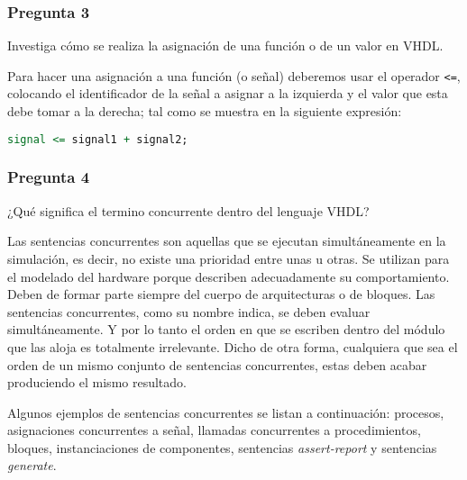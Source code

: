 \documentclass[../procedimientos.tex]{subfiles}
\begin{document}
\subsubsection*{Pregunta 3}
\begin{em}
  Investiga cómo se realiza la asignación de una función o de un valor en 
  VHDL.
\end{em}

Para hacer una asignación a una función (o señal) deberemos usar el operador 
\texttt{<=}, colocando el identificador de la señal a asignar a la izquierda y 
el valor que esta debe tomar a la derecha; tal como se muestra en la siguiente 
expresión:

\begin{lstlisting}[language=VHDL]
  signal <= signal1 + signal2;
\end{lstlisting}

\subsubsection*{Pregunta 4}
\begin{em}
  ¿Qué significa el termino concurrente dentro del lenguaje VHDL?
\end{em}

Las sentencias concurrentes son aquellas que se ejecutan simultáneamente en la 
simulación, es decir, no existe una prioridad entre unas u otras. Se utilizan 
para el modelado del hardware porque describen adecuadamente su 
comportamiento. Deben de formar parte siempre del cuerpo de arquitecturas o de 
bloques.  Las sentencias concurrentes, como su nombre indica, se deben evaluar 
simultáneamente. Y por lo tanto el orden en que se escriben dentro del módulo 
que las aloja es totalmente irrelevante. Dicho de otra forma, cualquiera que 
sea el orden de un mismo conjunto de sentencias concurrentes, estas deben 
acabar produciendo el mismo resultado.

Algunos ejemplos de sentencias concurrentes se listan a continuación: 
procesos, asignaciones concurrentes a señal, llamadas concurrentes a 
procedimientos, bloques, instanciaciones de componentes, sentencias 
\textit{assert-report} y sentencias \textit{generate}.
\end{document}
